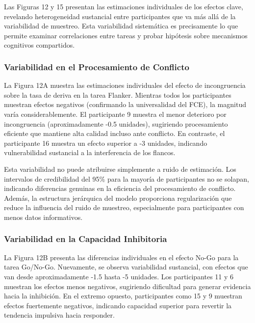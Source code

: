 \documentclass[
  spanish,
  10pt,
]{article}
\begin{document}
Las Figuras 12 y 15 presentan las estimaciones individuales de los
efectos clave, revelando heterogeneidad sustancial entre participantes
que va más allá de la variabilidad de muestreo. Esta variabilidad
sistemática es precisamente lo que permite examinar correlaciones entre
tareas y probar hipótesis sobre mecanismos cognitivos compartidos.

\subsubsection{Variabilidad en el Procesamiento de
Conflicto}\label{variabilidad-en-el-procesamiento-de-conflicto}

La Figura 12A muestra las estimaciones individuales del efecto de
incongruencia sobre la tasa de deriva en la tarea Flanker. Mientras
todos los participantes muestran efectos negativos (confirmando la
universalidad del FCE), la magnitud varía considerablemente. El
participante 9 muestra el menor deterioro por incongruencia
(aproximadamente -0.5 unidades), sugiriendo procesamiento eficiente que
mantiene alta calidad incluso ante conflicto. En contraste, el
participante 16 muestra un efecto superior a -3 unidades, indicando
vulnerabilidad sustancial a la interferencia de los flancos.

Esta variabilidad no puede atribuirse simplemente a ruido de estimación.
Los intervalos de credibilidad del 95\% para la mayoría de participantes
no se solapan, indicando diferencias genuinas en la eficiencia del
procesamiento de conflicto. Además, la estructura jerárquica del modelo
proporciona regularización que reduce la influencia del ruido de
muestreo, especialmente para participantes con menos datos informativos.

\subsubsection{Variabilidad en la Capacidad
Inhibitoria}\label{variabilidad-en-la-capacidad-inhibitoria}

La Figura 12B presenta las diferencias individuales en el efecto No-Go
para la tarea Go/No-Go. Nuevamente, se observa variabilidad sustancial,
con efectos que van desde aproximadamente -1.5 hasta -5 unidades. Los
participantes 11 y 6 muestran los efectos menos negativos, sugiriendo
dificultad para generar evidencia hacia la inhibición. En el extremo
opuesto, participantes como 15 y 9 muestran efectos fuertemente
negativos, indicando capacidad superior para revertir la tendencia
impulsiva hacia responder.
\end{document}
